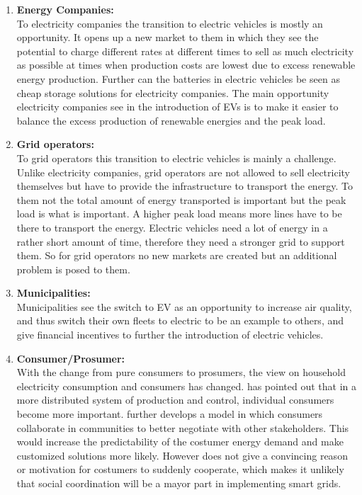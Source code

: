 \documentclass[a4paper]{article}
\begin{document}
\begin{enumerate}
 \item \textbf{Energy Companies:}\\
 To electricity companies the transition to electric vehicles is mostly an opportunity. It opens up a new market to them 
 in which they see the potential to charge different rates at different times to sell as much electricity as possible 
 at times when production costs are lowest due to excess renewable energy production. Further can the batteries in 
 electric vehicles be seen as cheap storage solutions for electricity companies. The main opportunity electricity 
 companies see in the introduction of EVs is to make it easier to balance the excess production of renewable energies
 and the peak load.
 \item \textbf{Grid operators:}\\
 To grid operators this transition to electric vehicles is mainly a challenge. 
 Unlike electricity companies, grid operators are not allowed to sell electricity themselves but have to provide the 
 infrastructure to transport the energy. To them not the total amount of energy transported is important but the 
 peak load is what is important. A higher peak load means more lines have to be there to transport the energy. 
 Electric vehicles need a lot of energy in a rather short amount of time, therefore they need a stronger grid to support 
 them. So for grid operators no new markets are created but an additional problem is posed to them. 
 \item \textbf{Municipalities:}\\
 Municipalities see the switch to EV as an opportunity to increase air quality, and thus switch their own fleets to 
 electric to be an example to others, and give financial incentives to further the introduction of electric vehicles. 
 \item \textbf{Consumer/Prosumer:}\\
 With the change from pure consumers to prosumers, the view on household electricity consumption and consumers has changed. 
 \cite{social_smart_grid} has pointed out that in a more distributed system of production and control, individual consumers 
 become more important. \cite{social_smart_grid} further develops a model in which consumers collaborate in communities 
 to better negotiate with other stakeholders. This would increase the predictability of the costumer energy demand and make 
 customized solutions more likely. However  \cite{social_smart_grid} does not give a convincing reason or motivation for costumers 
 to suddenly cooperate, which makes it unlikely that social coordination will be a mayor part in implementing smart grids. 
 
\end{enumerate}
\end{document}

